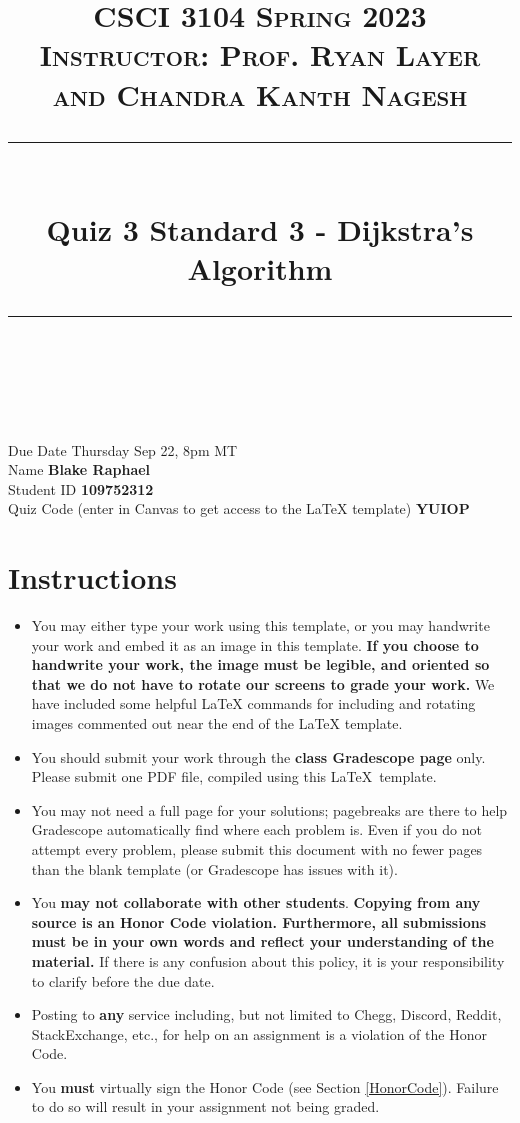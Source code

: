 \documentclass[11pt]{article}
\title{
\normalfont \normalsize 
\textsc{CSCI 3104 Spring 2023 \\ 
Instructor: Prof. Ryan Layer and Chandra Kanth Nagesh} \\
[10pt] 
\rule{\linewidth}{0.5pt} \\[6pt] 
\huge Quiz 3 Standard 3 - Dijkstra's Algorithm \\
\rule{\linewidth}{2pt}  \\[10pt]
}
\date{}
\theoremstyle{definition}
\theoremstyle{definition}
\theoremstyle{definition}
\begin{document}
\maketitle


\noindent
Due Date \dotfill Thursday Sep 22, 8pm MT \\
Name \dotfill \textbf{Blake Raphael} \\
Student ID \dotfill \textbf{109752312} \\
Quiz Code (enter in Canvas to get access to the LaTeX template) \dotfill \textbf{YUIOP}


\tableofcontents

\section*{Instructions}
 \begin{itemize}
	\item You may either type your work using this template, or you may handwrite your work and embed it as an image in this template. \textbf{If you choose to handwrite your work, the image must be legible, and oriented so that we do not have to rotate our screens to grade your work.} We have included some helpful LaTeX commands for including and rotating images commented out near the end of the LaTeX template.
	\item You should submit your work through the \textbf{class Gradescope page} only. Please submit one PDF file, compiled using this \LaTeX \ template.
	\item You may not need a full page for your solutions; pagebreaks are there to help Gradescope automatically find where each problem is. Even if you do not attempt every problem, please submit this document with no fewer pages than the blank template (or Gradescope has issues with it).

	\item You \textbf{may not collaborate with other students}. \textbf{Copying from any source is an Honor Code violation. Furthermore, all submissions must be in your own words and reflect your understanding of the material.} If there is any confusion about this policy, it is your responsibility to clarify before the due date. 

	\item Posting to \textbf{any} service including, but not limited to Chegg, Discord, Reddit, StackExchange, etc., for help on an assignment is a violation of the Honor Code.

	\item You \textbf{must} virtually sign the Honor Code (see Section \ref{HonorCode}). Failure to do so will result in your assignment not being graded.
\end{itemize}
\end{document}
